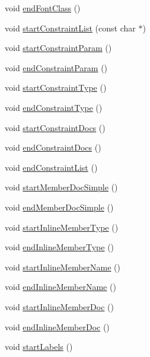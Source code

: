 \begin{DoxyCompactItemize}
\item 
void \hyperlink{class_man_generator_a35a79c6fc4ee7bd9eeadb74181e368d1}{end\+Font\+Class} ()
\item 
void \hyperlink{class_man_generator_a0f2e73868294b926079a00988aa11723}{start\+Constraint\+List} (const char $\ast$)
\item 
void \hyperlink{class_man_generator_a0093d745b94f89f5812c48dbdce045e7}{start\+Constraint\+Param} ()
\item 
void \hyperlink{class_man_generator_a2269ac68c06f0006836ee3b271384cbb}{end\+Constraint\+Param} ()
\item 
void \hyperlink{class_man_generator_a626fe47f183f5e46f31a51dc2f18c26f}{start\+Constraint\+Type} ()
\item 
void \hyperlink{class_man_generator_a6fc86f040a965fab5351b5cf8f354ffe}{end\+Constraint\+Type} ()
\item 
void \hyperlink{class_man_generator_a1f03a92bea2c4acbefdfc92123dd9734}{start\+Constraint\+Docs} ()
\item 
void \hyperlink{class_man_generator_af4014137523e746f07ce3d970b2bac53}{end\+Constraint\+Docs} ()
\item 
void \hyperlink{class_man_generator_adbc0ed48b04dc681013a923ce25f5042}{end\+Constraint\+List} ()
\item 
void \hyperlink{class_man_generator_a28f3366da25f1b84830c17ccc2f54cae}{start\+Member\+Doc\+Simple} ()
\item 
void \hyperlink{class_man_generator_a04b270ad1abc310fb118e4acfb66f770}{end\+Member\+Doc\+Simple} ()
\item 
void \hyperlink{class_man_generator_a6be4bb76041b91204e6acc46d525ef06}{start\+Inline\+Member\+Type} ()
\item 
void \hyperlink{class_man_generator_abd751e3031872460ad18adcd0fcbe327}{end\+Inline\+Member\+Type} ()
\item 
void \hyperlink{class_man_generator_adcf4b862758e2dc7e82c41f5a8a349fd}{start\+Inline\+Member\+Name} ()
\item 
void \hyperlink{class_man_generator_abeb4bc9d427b3cbd413966341177887e}{end\+Inline\+Member\+Name} ()
\item 
void \hyperlink{class_man_generator_afcb07fc4770fc15d8de94c9896f79bae}{start\+Inline\+Member\+Doc} ()
\item 
void \hyperlink{class_man_generator_ac6140ac8dcdd0c2e53b8e4002c56e2eb}{end\+Inline\+Member\+Doc} ()
\item 
void \hyperlink{class_man_generator_aeee5f7cf35dd6749a0bbd65b5bfe6c0e}{start\+Labels} ()

\end{DoxyCompactItemize}
